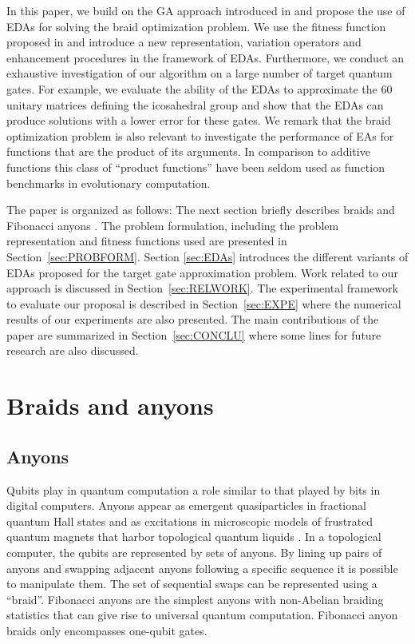 In this paper, we build on the GA approach introduced in  \cite{Mcdonald_and_Katzgraber:2013} and  propose the use of EDAs for solving the braid optimization problem. We use the fitness function proposed in \cite{Mcdonald_and_Katzgraber:2013} and introduce a new representation, variation operators and enhancement procedures in the framework of EDAs. Furthermore, we conduct an exhaustive investigation of our algorithm on a large number of target  quantum gates. For example, we evaluate the ability of the EDAs to approximate the $60$ unitary matrices defining the icosahedral group \cite{Burrello_et_al:2010} and show that the EDAs can produce solutions with a lower error for these gates. We remark that the braid optimization problem is also relevant to investigate the performance of EAs for functions that are the product of its arguments. In comparison to additive functions this  class of ``product functions'' have been seldom used as function benchmarks in evolutionary computation. 


 The paper is organized as follows:  The next section briefly describes braids and Fibonacci anyons  \cite{Bonesteel_et_al:2005}.  The problem formulation, including the problem representation and fitness functions used are presented in Section~\ref{sec:PROBFORM}. Section \ref{sec:EDAs} introduces the different variants of EDAs proposed for the target gate approximation problem.  Work related to our approach is discussed in Section~\ref{sec:RELWORK}.  The experimental framework to evaluate our proposal is described in Section~\ref{sec:EXPE} where the numerical results of our experiments are also presented. The main contributions of the paper are summarized in Section~\ref{sec:CONCLU} where some lines for future research are also discussed. 


\section{Braids and anyons} \label{sec:BRAIDS}

\subsection{Anyons}

 Qubits play in quantum computation a role similar to that played by bits in digital computers. Anyons appear as emergent quasiparticles in fractional quantum Hall states and as excitations in microscopic models of frustrated quantum magnets that harbor topological quantum liquids \cite{Read_and_Rezayi:1999}. In a topological computer, the qubits are represented by sets of anyons. By lining up pairs of anyons and swapping adjacent anyons following a specific sequence it is possible to manipulate them. The set of sequential swaps can be represented using a ``braid''.  Fibonacci anyons are the simplest anyons with non-Abelian braiding statistics that can give rise to universal quantum computation. Fibonacci anyon braids \cite{Bonesteel_et_al:2005} only encompasses one-qubit gates.

